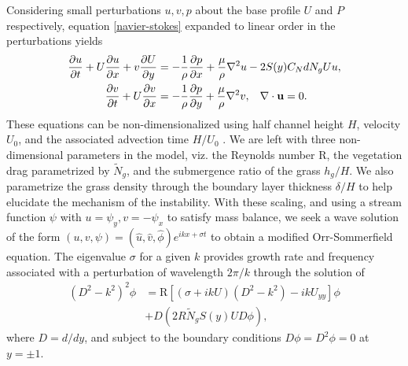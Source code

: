 \documentclass[aps,prl,twocolumn,showpacs,superscriptaddress,groupedaddress,10pt]{revtex4-1}  %
\newcommand{\bu}{\mathbf{u}}
\newcommand{\del}{\partial}
\newcommand{\Rey}{\text{R}}
\newcommand{\Ndg}{\tilde{N}_g}
\begin{document}
Considering small perturbations $u, v, p$ about the base profile $U$ and $P$ respectively, equation \eqref{navier-stokes} expanded to linear order in the perturbations yields
\begin{equation}
\begin{split}
\frac{\del u}{\del t}+U\frac{\del u}{\del x}+v\frac{\del U}{\del y} &= -\frac{1}{\rho}\frac{\del p}{\del x}+\frac{\mu}{\rho}\nabla^2u-2S(y) C_{N}dN_{g}Uu, \\
\frac{\del v}{\del  t}+ U\frac{\del v}{\del x} &= -\frac{1}{\rho}\frac{\del p}{\del y}+\frac{\mu}{\rho}\nabla^2v, \hspace{0.3cm} \nabla\cdot\bu=0.
\end{split}
\end{equation}
These equations can be non-dimensionalized using half channel height $H$, velocity $U_0$, and the associated advection time $H/U_0$ . 
We are left with three non-dimensional parameters in the model, viz. the Reynolds number $\Rey$, the vegetation drag parametrized by $\Ndg$, 
and the submergence ratio of the grass $h_g/H$. We also parametrize the grass density through the boundary layer thickness $\delta/H$ to help elucidate the mechanism of the instability. With these scaling, and using a stream function $\psi$ with $u = \psi_{y}, v= -\psi_x$ to satisfy mass balance, we seek a wave solution of the form $\left(u,v,\psi \right)= \left(\hat u, \hat v, \hat\phi \right)e^{ikx+\sigma t}$ to  obtain a modified Orr-Sommerfield equation. The eigenvalue $\sigma$ for a given $k$ provides growth rate and frequency associated with a perturbation of wavelength $2\pi/k$ through the solution of
\begin{equation}
\begin{split}
\left(D^2 -k^{2} \right)^2\phi &= \Rey \left[ \left({\sigma}+ikU\right) \left(D^2-k^2\right) -ikU_{yy}\right]\phi \\
&+D\left(2R \Ndg S(y) U D \phi\right),
\label{Orr-somerfield}
\end{split}
\end{equation}
where $D=d/dy$, and subject to the boundary conditions $D\phi = D^2\phi = 0$ at $y=\pm 1$. 
\end{document}
